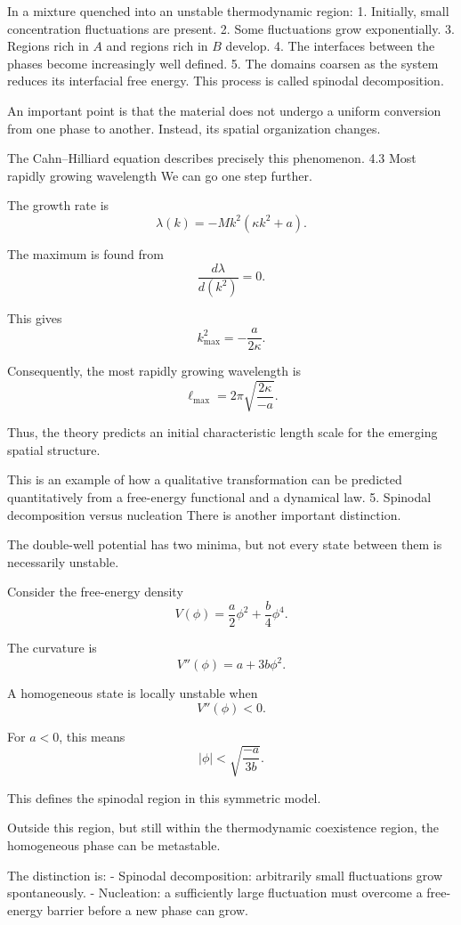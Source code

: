 In a mixture quenched into an unstable thermodynamic region:
1. Initially, small concentration fluctuations are present.
2. Some fluctuations grow exponentially.
3. Regions rich in \(A\) and regions rich in \(B\) develop.
4. The interfaces between the phases become increasingly well defined.
5. The domains coarsen as the system reduces its interfacial free energy.
This process is called spinodal decomposition.

An important point is that the material does not undergo a uniform conversion from one phase to another. Instead, its spatial organization changes.

The Cahn–Hilliard equation describes precisely this phenomenon.
4.3 Most rapidly growing wavelength
We can go one step further.

The growth rate is
\[
\lambda(k)
=
-Mk^2(\kappa k^2+a).
\]

The maximum is found from
\[
\frac{d\lambda}{d(k^2)}=0.
\]

This gives
\[
k_{\mathrm{max}}^2=-\frac{a}{2\kappa}.
\]

Consequently, the most rapidly growing wavelength is
\[
\boxed{
\ell_{\mathrm{max}}
=
2\pi\sqrt{\frac{2\kappa}{-a}}.
}
\]

Thus, the theory predicts an initial characteristic length scale for the emerging spatial structure.

This is an example of how a qualitative transformation can be predicted quantitatively from a free-energy functional and a dynamical law.
5. Spinodal decomposition versus nucleation
There is another important distinction.

The double-well potential has two minima, but not every state between them is necessarily unstable.

Consider the free-energy density
\[
V(\phi)=\frac a2\phi^2+\frac b4\phi^4.
\]

The curvature is
\[
V''(\phi)=a+3b\phi^2.
\]

A homogeneous state is locally unstable when
\[
V''(\phi)<0.
\]

For \(a<0\), this means
\[
|\phi|<\sqrt{\frac{-a}{3b}}.
\]

This defines the spinodal region in this symmetric model.

Outside this region, but still within the thermodynamic coexistence region, the homogeneous phase can be metastable.

The distinction is:
- Spinodal decomposition: arbitrarily small fluctuations grow spontaneously.
- Nucleation: a sufficiently large fluctuation must overcome a free-energy barrier before a new phase can grow.






















